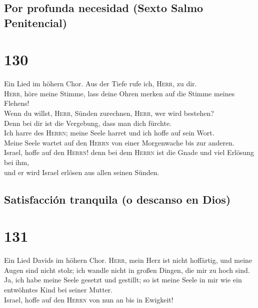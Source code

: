 \hypertarget{por-profunda-necesidad-sexto-salmo-penitencial}{%
\subsection{Por profunda necesidad (Sexto Salmo
Penitencial)}\label{por-profunda-necesidad-sexto-salmo-penitencial}}

\hypertarget{section-129}{%
\section{130}\label{section-129}}

 Ein Lied im höhern Chor. Aus der Tiefe rufe ich,
\textsc{Herr}, zu dir.\\
 \textsc{Herr}, höre meine Stimme, lass deine Ohren merken
auf die Stimme meines Flehens!\\
 Wenn du willst, \textsc{Herr}, Sünden zurechnen,
\textsc{Herr}, wer wird bestehen?\\
 Denn bei dir ist die Vergebung, dass man dich fürchte.\\
 Ich harre des \textsc{Herrn}; meine Seele harret und ich
hoffe auf sein Wort.\\
 Meine Seele wartet auf den \textsc{Herrn} von einer
Morgenwache bis zur anderen.\\
 Israel, hoffe auf den \textsc{Herrn}! denn bei dem
\textsc{Herrn} ist die Gnade und viel Erlösung bei ihm,\\
 und er wird Israel erlösen aus allen seinen Sünden.

\hypertarget{satisfacciuxf3n-tranquila-o-descanso-en-dios}{%
\subsection{Satisfacción tranquila (o descanso en
Dios)}\label{satisfacciuxf3n-tranquila-o-descanso-en-dios}}

\hypertarget{section-130}{%
\section{131}\label{section-130}}

 Ein Lied Davids im höhern Chor. \textsc{Herr}, mein Herz
ist nicht hoffärtig, und meine Augen sind nicht stolz; ich wandle nicht
in großen Dingen, die mir zu hoch sind.\\
 Ja, ich habe meine Seele gesetzt und gestillt; so ist
meine Seele in mir wie ein entwöhntes Kind bei seiner Mutter.\\
 Israel, hoffe auf den \textsc{Herrn} von nun an bis in
Ewigkeit!

